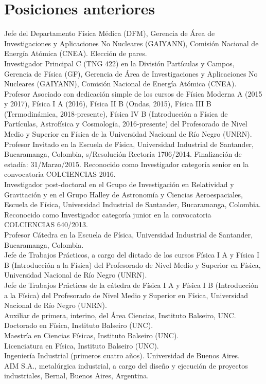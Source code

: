 \section*{Posiciones anteriores}
\noindent
{} Jefe del Departamento Física Médica (DFM), Gerencia de Área de Investigaciones y Aplicaciones No Nucleares (GAIYANN), Comisión Nacional de Energía Atómica (CNEA). Elección de pares.\\
 Investigador Principal C (TNG 422) en la División Partículas y Campos, Gerencia de Física (GF), Gerencia de Área de Investigaciones y Aplicaciones No Nucleares (GAIYANN), Comisión Nacional de Energía Atómica (CNEA).\\
 Profesor Asociado con dedicación simple de los cursos de Física Moderna A (2015 y 2017), Física I A (2016), Física II B (Ondas, 2015), Física III B (Termodinámica, 2018-presente), Física IV B (Introducción a Física de Partículas, Astrofísica y Cosmología, 2016-presente) del Profesorado de Nivel Medio y Superior en Física de la Universidad Nacional de Río Negro (UNRN).\\
 Profesor Invitado en la Escuela de Física, Universidad Industrial de Santander, Bucaramanga, Colombia, s/Resolución Rectoría 1706/2014. Finalización de estadía: 31/Marzo/2015. Reconocido como Investigador categoría senior en la convocatoria COLCIENCIAS 2016.\\
 Investigador post-doctoral en el Grupo de Investigación en Relatividad y Gravitación y en el Grupo Halley de Astronomía y Ciencias Aeroespaciales, Escuela de Física, Universidad Industrial de Santander, Bucaramanga, Colombia. Reconocido como Investigador categoría junior en la convocatoria COLCIENCIAS 640/2013.\\
 Profesor Cátedra en la Escuela de Física, Universidad Industrial de Santander, Bucaramanga, Colombia.\\
 Jefe de Trabajos Prácticos, a cargo del dictado de los cursos Física I A y Física I B (Introducción a la Física) del Profesorado de Nivel Medio y Superior en Física, Universidad Nacional de Río Negro (UNRN).\\
 Jefe de Trabajos Prácticos de la cátedra de Física I A y Física I B (Introducción a la Física) del Profesorado de Nivel Medio y Superior en Física, Universidad Nacional de Río Negro (UNRN).\\
 Auxiliar de primera, interino, del Área Ciencias, Instituto Balseiro, UNC.\\
 Doctorado en Física, Instituto Balseiro (UNC).\\
 Maestría en Ciencias Físicas, Instituto Balseiro (UNC).\\
 Licenciatura en Física, Instituto Balseiro (UNC).\\
 Ingeniería Industrial (primeros cuatro años). Universidad de Buenos Aires.\\
 AIM S.A., metalúrgica industrial, a cargo del diseño y ejecución de proyectos industriales, Bernal, Buenos Aires, Argentina.\\
\fi
\fi

